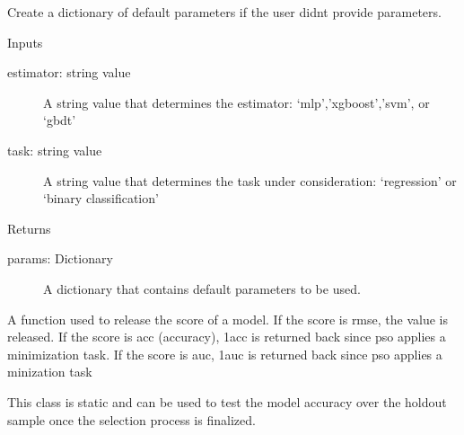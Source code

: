 \documentclass[letterpaper,10pt,english]{sphinxmanual}
\begin{document}
\begin{fulllineitems}

\begin{fulllineitems}
\label{\detokenize{index:pspso.pspso.get_default_search_space}}
Create a dictionary of default parameters if the user didnt provide parameters.

Inputs
\begin{description}
\item[{estimator: string value}] \leavevmode
A string value that determines the estimator: ‘mlp’,’xgboost’,’svm’, or ‘gbdt’

\item[{task: string value}] \leavevmode
A string value that determines the task under consideration: ‘regression’ or ‘binary classification’

\end{description}

Returns
\begin{description}
\item[{params: Dictionary}] \leavevmode
A dictionary that contains default parameters to be used.

\end{description}

\end{fulllineitems}


\begin{fulllineitems}
\label{\detokenize{index:pspso.pspso.predict}}
A function used to release the score of a model.
If the score is rmse, the value is released.
If the score is acc (accuracy), 1\sphinxhyphen{}acc is returned back since pso applies a minimization task.
If the score is auc, 1\sphinxhyphen{}auc is returned back since pso applies a minization task

This class is static and can be used to test the model accuracy over the hold\sphinxhyphen{}out sample once the selection process is finalized.


\end{fulllineitems}
\end{fulllineitems}
\end{document}
